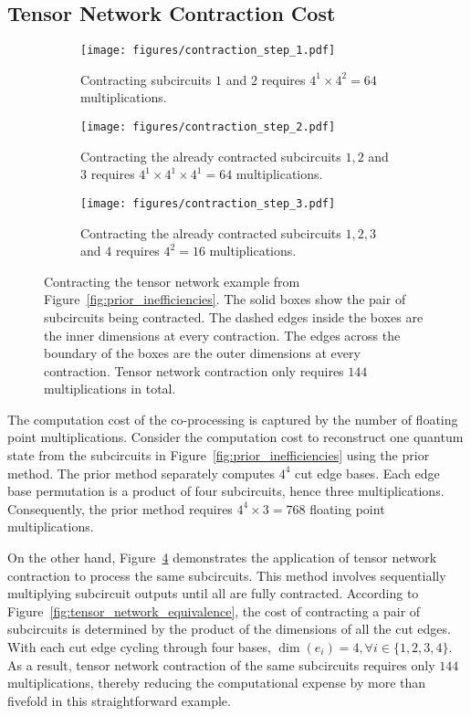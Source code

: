 \subsection{Tensor Network Contraction Cost}\label{sec:contraction_cost}
\begin{figure}[t]
    \centering
    \begin{subfigure}{0.4\textwidth}
        \centering
        \texttt{[image: figures/contraction\_step\_1.pdf]}
        \caption{Contracting subcircuits $1$ and $2$ requires $4^1\times4^2=64$ multiplications.}
        \label{fig:contraction_step_1}
    \end{subfigure}
    \begin{subfigure}{0.4\textwidth}
        \centering
        \texttt{[image: figures/contraction\_step\_2.pdf]}
        \caption{Contracting the already contracted subcircuits $1,2$ and $3$ requires $4^1\times4^1\times4^1=64$ multiplications.}
        \label{fig:contraction_step_2}
    \end{subfigure}
    \begin{subfigure}{0.2\textwidth}
        \centering
        \texttt{[image: figures/contraction\_step\_3.pdf]}
        \caption{Contracting the already contracted subcircuits $1,2,3$ and $4$ requires $4^2=16$ multiplications.}
        \label{fig:contraction_step_3}
    \end{subfigure}
    \caption{Contracting the tensor network example from Figure~\ref{fig:prior_inefficiencies}.
    The solid boxes show the pair of subcircuits being contracted.
    The dashed edges inside the boxes are the inner dimensions at every contraction.
    The edges across the boundary of the boxes are the outer dimensions at every contraction.
    Tensor network contraction only requires $144$ multiplications in total.}
    \label{fig:contraction_steps}
\end{figure}

The computation cost of the co-processing is captured by the number of floating point multiplications.
Consider the computation cost to reconstruct one quantum state from the subcircuits in Figure~\ref{fig:prior_inefficiencies} using the prior method.
The prior method separately computes $4^4$ cut edge bases.
Each edge base permutation is a product of four subcircuits,
hence three multiplications.
Consequently, the prior method requires $4^4\times3=768$ floating point multiplications.

On the other hand,
Figure~\ref{fig:contraction_steps} demonstrates the application of tensor network contraction to process the same subcircuits.
This method involves sequentially multiplying subcircuit outputs until all are fully contracted.
According to Figure~\ref{fig:tensor_network_equivalence},
the cost of contracting a pair of subcircuits is determined by the product of the dimensions of all the cut edges.
With each cut edge cycling through four bases,
$\dim(e_i)=4,\forall i\in\{1,2,3,4\}$.
As a result, tensor network contraction of the same subcircuits requires only $144$ multiplications,
thereby reducing the computational expense by more than fivefold in this straightforward example.

